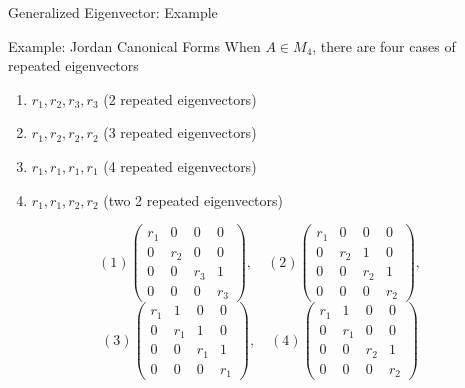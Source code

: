 \documentclass[final]{beamer}
\begin{document}
\begin{frame}[t]{Generalized Eigenvector: Example}
	\begin{block}{Example: Jordan Canonical Forms}
		When $A\in M_4$, there are four cases of repeated eigenvectors
		\begin{enumerate}
			\item $r_1,r_2,r_3,r_3$ (2 repeated eigenvectors)
			\item $r_1,r_2,r_2,r_2$ (3 repeated eigenvectors)
			\item $r_1,r_1,r_1,r_1$ (4 repeated eigenvectors)
			\item $r_1,r_1,r_2,r_2$ (two 2 repeated eigenvectors)
		\end{enumerate}
		\[
			(1) \begin{pmatrix}
				r_1 & 0 & 0 & 0\\
				0 & r_2 & 0 & 0\\
				0 & 0 & r_3 & 1\\
				0 & 0 & 0 & r_3
			\end{pmatrix},\quad (2) \begin{pmatrix}
				r_1 & 0 & 0 & 0\\
				0 & r_2 & 1 & 0\\
				0 & 0 & r_2 & 1\\
				0 & 0 & 0 & r_2
			\end{pmatrix},
		\]\[
			(3) \begin{pmatrix}
							r_1 & 1 & 0 & 0\\
							0 & r_1 & 1 & 0\\
							0 & 0 & r_1 & 1\\
							0 & 0 & 0 & r_1
						\end{pmatrix},\quad (4)\begin{pmatrix}
							r_1 & 1 & 0 & 0\\
							0 & r_1 & 0 & 0\\
							0 & 0 & r_2 & 1\\
							0 & 0 & 0 & r_2
						\end{pmatrix}
		\]
	\end{block}
\end{frame}
\end{document}
